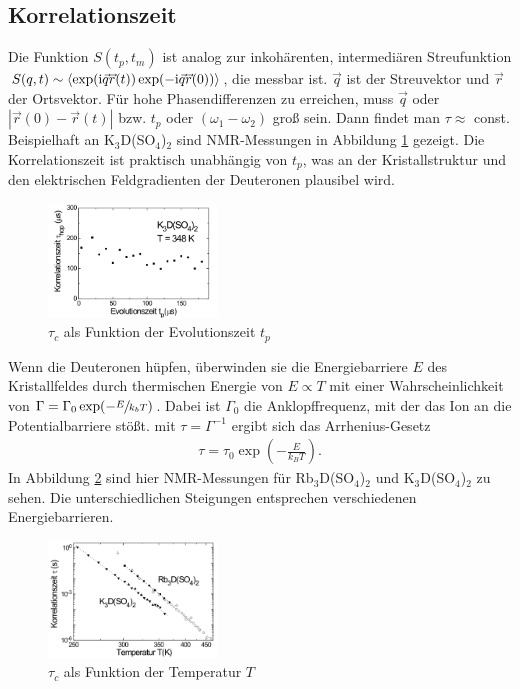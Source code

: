 \subsection{Korrelationszeit}
Die Funktion $S(t_p,t_m)$ ist analog zur inkohärenten, intermediären Streufunktion 
$S(q,t) \sim \langle\exp(\text{i}\vec q \vec r(t))\exp(-\text{i}\vec q \vec r(0))\rangle$, die messbar ist. $\vec q$ ist der Streuvektor und $\vec r$ der Ortsvektor. Für
hohe Phasendifferenzen zu erreichen, muss $\vec q$ oder $|\vec r(0)-\vec r(t)|$ bzw. $t_p$ oder $(\omega_1-\omega_2)$ groß sein. Dann findet man $\tau \approx$
const. Beispielhaft an K$_3$D(SO$_4$)$_2$ sind NMR-Messungen in Abbildung \ref{pic_tau(tp)} gezeigt. Die Korrelationszeit ist praktisch unabhängig von $t_p$,
was an der Kristallstruktur und den elektrischen Feldgradienten der Deuteronen plausibel wird.
\begin{figure}[H]
 \includegraphics[width=0.4\textwidth]{../pics/tau(tp).jpg}
 \caption{$\tau_c$ als Funktion der Evolutionszeit $t_p$}
 \label{pic_tau(tp)}
\end{figure}
\noindent
Wenn die Deuteronen hüpfen, überwinden sie die Energiebarriere $E$ des Kristallfeldes durch thermischen Energie von $E \propto T$ mit einer Wahrscheinlichkeit
von $\Gamma = \Gamma_0 \exp(-\sfrac{E}{k_bT})$. Dabei ist $\Gamma_0$ die Anklopffrequenz, mit der das Ion an die Potentialbarriere stößt. mit 
$\tau = \Gamma^{-1}$ ergibt sich das Arrhenius-Gesetz
\begin{align}
 \tau = \tau_0 \exp \left(-\frac{E}{k_BT}\right).
 \label{eq_korrelationszeit}
\end{align}
In Abbildung \ref{pic_tau(T)} sind hier NMR-Messungen für Rb$_3$D(SO$_4$)$_2$ und K$_3$D(SO$_4$)$_2$ zu sehen. Die unterschiedlichen Steigungen entsprechen
verschiedenen Energiebarrieren.

\begin{figure}[H]
 \includegraphics[width=0.4\textwidth]{../pics/tau(T).jpg}
 \caption{$\tau_c$ als Funktion der Temperatur $T$}
 \label{pic_tau(T)}
\end{figure}

